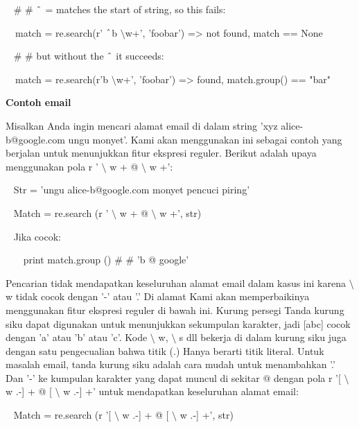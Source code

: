 \begin {enumerate}
\begin {enumerate}
\vspace{12pt}
\noindent
~  $  \#  $ $  \#  $  $  \string^  $ = matches the start of string, so this fails: \par
\noindent
~~match = re.search(r' $  \string^  $b $  \setminus  $w+', 'foobar') =>  not found, match == None \par
\noindent
~  $  \#  $ $  \#  $ but without the  $  \string^  $ it succeeds: \par
\noindent
~~match = re.search(r'b $  \setminus  $w+', 'foobar') =>  found, match.group() == "bar" \par
\vspace{12pt}
\vspace{12pt}
\noindent
{\fontsize{14pt}{14pt}\selectfont \textbf{Contoh email} \\} \par
Misalkan Anda ingin mencari alamat email di dalam string 'xyz alice-b@google.com ungu monyet'. Kami akan menggunakan ini sebagai contoh yang berjalan untuk menunjukkan fitur ekspresi reguler. Berikut adalah upaya menggunakan pola r ' $  \setminus  $ w + @  $  \setminus  $ w +': \par
\vspace{12pt}
\noindent
~ Str = 'ungu alice-b@google.com monyet pencuci piring' \par
\noindent
~ Match = re.search (r ' $  \setminus  $ w + @  $  \setminus  $ w +', str) \par
\noindent
~ Jika cocok: \par
\noindent
~~~ print match.group ()  $  \#  $ $  \#  $ 'b @ google' \par
\vspace{12pt}
Pencarian tidak mendapatkan keseluruhan alamat email dalam kasus ini karena  $  \setminus  $ w tidak cocok dengan '-' atau '.' Di alamat Kami akan memperbaikinya menggunakan fitur ekspresi reguler di bawah ini. Kurung persegi Tanda kurung siku dapat digunakan untuk menunjukkan sekumpulan karakter, jadi [abc] cocok dengan 'a' atau 'b' atau 'c'. Kode  $  \setminus  $ w,  $  \setminus  $ s dll bekerja di dalam kurung siku juga dengan satu pengecualian bahwa titik (.) Hanya berarti titik literal. Untuk masalah email, tanda kurung siku adalah cara mudah untuk menambahkan '.' Dan '-' ke kumpulan karakter yang dapat muncul di sekitar @ dengan pola r '[ $  \setminus  $ w .-] + @ [ $  \setminus  $ w .-] +' untuk mendapatkan keseluruhan alamat email: \par
\vspace{12pt}
\noindent
~ Match = re.search (r '[ $  \setminus  $ w .-] + @ [ $  \setminus  $ w .-] +', str) \par

\end{enumerate}
\end{enumerate}
